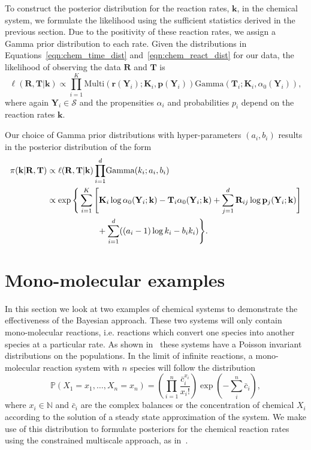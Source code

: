 \documentclass[final]{siamltex}
\begin{document}
To construct the posterior distribution for the reaction rates, $\mathbf{k}$, in the chemical system, we formulate the likelihood using the sufficient statistics derived in the previous section. Due to the positivity of these reaction rates, we assign a Gamma prior distribution to each rate. Given the distributions in Equations~\eqref{eqn:chem_time_dist} and~\eqref{eqn:chem_react_dist} for our data, the likelihood of observing the data $\mathbf{R}$ and $\mathbf{T}$ is
\[
	\ell(\mathbf{R}, \mathbf{T}|\mathbf{k}) \propto \prod\limits_{i=1}^K \text{Multi}(\mathbf{r}(\mathbf{Y}_i); \mathbf{K}_i, \mathbf{p}(\mathbf{Y}_i))\text{Gamma}(\mathbf{T}_i; \mathbf{K}_i, \alpha_0(\mathbf{Y}_i)),
\]
where again $\mathbf{Y}_i \in \mathcal{S}$ and the propensities $\alpha_i$ and probabilities $p_i$ depend on the reaction rates $\mathbf{k}$.

Our choice of Gamma prior distributions with hyper-parameters $(a_i, b_i)$ results in the posterior distribution of the form
\begin{align}
	\pi(\mathbf{k}|\mathbf{R}, \mathbf{T}) &\propto \ell(\mathbf{R}, \mathbf{T}|\mathbf{k})
	\prod_{i=1}^d \! \text{Gamma}(k_i; a_i, b_i) \notag \\
		&\propto \exp\Bigg\{\sum\limits_{i=1}^K \Bigg[
				\mathbf{K}_i\log \alpha_0(\mathbf{Y}_i; \mathbf{k}) - \mathbf{T}_i\alpha_0(\mathbf{Y}_i; \mathbf{k}) %
				+\sum_{j=1}^d \mathbf{R}_{ij}\log\mathbf{p}_j(\mathbf{Y}_i; \mathbf{k})
			\Bigg]  \notag\\
		&	\qquad\qquad\qquad{} + \sum_{i=1}^d ((a_i-1)\log k_i - b_ik_i)\Bigg\}. \label{eqn:chem_posterior}
\end{align}

\section{Mono-molecular examples}

In this section we look at two examples of chemical systems to demonstrate the effectiveness of the Bayesian approach. These two systems will only contain mono-molecular reactions, i.e. reactions which convert one species into another species at a particular rate. As shown in~\cite{anderson2010product} these systems have a Poisson invariant distributions on the populations. In the limit of infinite reactions, a mono-molecular reaction system with $n$ species will follow the distribution
\begin{equation}\label{eqn:mono_stat_dist}
	\mathbb{P}(X_1=x_1, \ldots, X_n=x_n) = \left(\prod_{i=1}^n \! \frac{\bar{c}_i^{x_i}}{x_i!}\right)\exp\left(-\sum_i^n \! \bar{c}_i\right),
\end{equation}
where $x_i \in \mathbb{N}$ and $\bar{c}_i$ are the complex balances or the concentration of chemical $X_i$ according to the solution of a steady state approximation of the system. We make use of this distribution to formulate posteriors for the chemical reaction rates using the constrained multiscale approach, as in~\cite{cotter2016constrained}.
\end{document}
